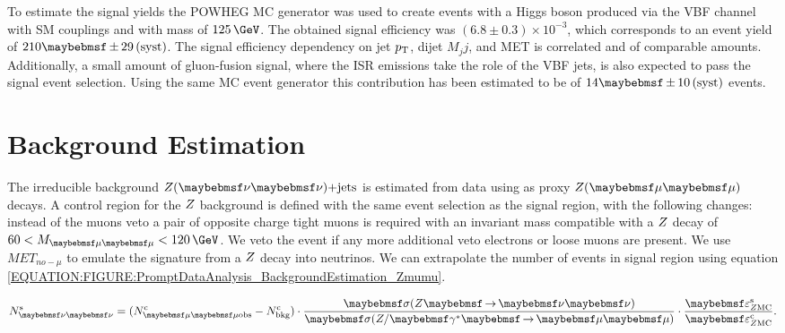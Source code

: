 To estimate the signal yields the \textsc{POWHEG} \gls{MC} generator \cite{ARTICLE:POWHEG_2007,ARTICLE:POWHEG_2011} was used to create events with a Higgs boson produced via the \gls{VBF} channel with \gls{SM} couplings and with mass of $125\,\GeV$. The obtained signal efficiency was $(6.8 \pm 0.3) \times 10^{-3}$, which corresponds to an event yield of $210 \pm 29\syst$. The signal efficiency dependency on jet $p_{\mathrm{T}}$, dijet $M_jj$, and \gls{MET} is correlated and of comparable amounts. Additionally, a small amount of gluon-fusion signal, where the \gls{ISR} emissions take the role of the \gls{VBF} jets, is also expected to pass the signal event selection. Using the same \gls{MC} event generator this contribution has been estimated to be of $14 \pm 10\syst$ events.

\section{Background Estimation}
\label{SECTION:PromptDataAnalysis_BackgroundEstimation}


The irreducible background $\Z(\nu \nu)\text{+jets}$ is estimated from data using as proxy $\Z (\mu \mu)$ decays. A control region for the $Z$ background is defined with the same event selection as the signal region, with the following changes: instead of the muons veto a pair of opposite charge tight muons is required with an invariant mass compatible with a $Z$ decay of $60 < M_{\mu\mu}<120\,\GeV$. We veto the event if any more additional veto electrons or loose muons are present. We use $MET_{no-\mu}$ to emulate the signature from a $Z$ decay into neutrinos. We can extrapolate the number of events in signal region using equation \ref{EQUATION:FIGURE:PromptDataAnalysis_BackgroundEstimation_Zmumu}.

\begin{equation}
N^\mathrm{s}_{\nu\nu} = (N^\mathrm{c}_{\mu\mu\text{obs}} - N^\mathrm{c}_\text{bkg}) \cdot \frac{\sigma(\Z \to \nu\nu)}{\sigma(\Z/\gamma^{*} \to \mu\mu)} \cdot \frac{\varepsilon^\mathrm{s}_{\Z \mathrm{MC}}}{\varepsilon^\mathrm{c}_{\Z \mathrm{MC}}}.
\label{EQUATION:FIGURE:PromptDataAnalysis_BackgroundEstimation_Zmumu}
\end{equation}


